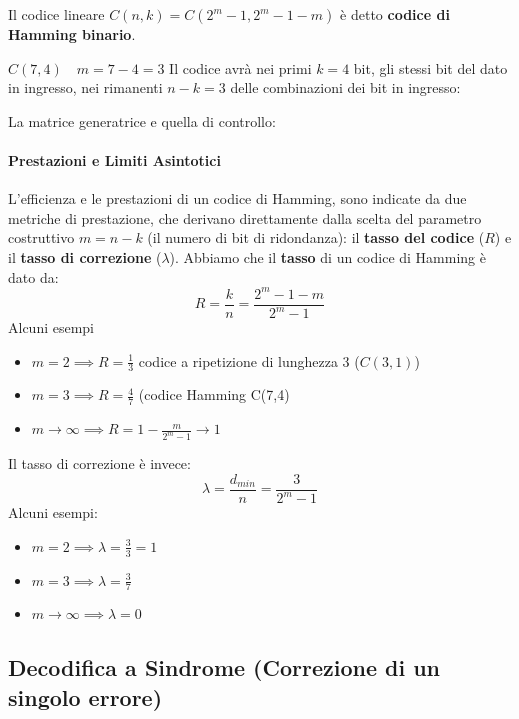 Il codice lineare $C(n,k)=C(2^m-1,2^m-1-m)$ è detto \textbf{codice di Hamming binario}.

\begin{esempio}{$C(7,4) \quad m=7-4=3$}
Il codice avrà nei primi $k=4$ bit, gli stessi bit del dato in ingresso, nei rimanenti $n-k=3$ delle combinazioni dei bit in ingresso:



La matrice generatrice e quella di controllo:

\end{esempio}


\paragraph{Prestazioni e Limiti Asintotici}

L'efficienza e le prestazioni di un codice di Hamming, sono indicate da due metriche di prestazione, che derivano direttamente dalla scelta del parametro costruttivo $m=n-k$ (il numero di bit di ridondanza): il \textbf{tasso del codice} ($R$) e il \textbf{tasso di correzione} ($\lambda$).
Abbiamo che il \textbf{tasso} di un codice di Hamming è dato da:
\[R= \frac{k}{n}=\frac{2^m-1-m}{2^m-1}\] 
Alcuni esempi
\begin{itemize}
    \item $m=2 \implies R=\frac{1}{3}$ codice a ripetizione di lunghezza $3$ ($C(3,1)$)
    
    \item $ m=3 \implies R=\frac{4}{7}$ (codice Hamming C(7,4)
    
    \item $m\to \infty \implies R = 1 - \frac{m}{2^m - 1} \to 1$
\end{itemize}
Il tasso di correzione è invece:
\[\lambda = \frac{d_{min}}{n}=\frac{3}{2^m-1}\]
Alcuni esempi:
\begin{itemize}
    \item $m=2 \implies \lambda = \frac{3}{3}=1$
    \item $m=3 \implies \lambda = \frac{3}{7}$
    \item $m \to \infty \implies \lambda = 0$
\end{itemize}

\subsection{Decodifica a Sindrome (Correzione di un singolo errore)}

